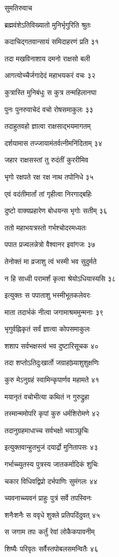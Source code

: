 सुमतिरुवाच

ब्रह्मवंशेऽतिविख्यातो मुनिर्भृगुरिति श्रुतः

कदाचिद्गतवान्सायं समिदाहरणं प्रति ३१

तदा मखविनाशाय दमनो राक्षसो बली

आगत्योच्चैर्जगादेदं महाभयकरं वचः ३२

कुत्रास्ति मुनिबंधुः स कुत्र तन्महिलानघा

पुनः पुनरुवाचेदं वचो रोषसमाकुलः ३३

तदाहुतवहो ज्ञात्वा राक्षसाद्भयमागतम्

दर्शयामास तज्जायामंतर्वत्नीमनिंदिताम् ३४

जहार राक्षसस्तां तु रुदंतीं कुररीमिव

भृगो रक्षपते रक्ष रक्ष नाथ तपोनिधे ३५

एवं वदंतीमार्तां तां गृहीत्वा निरगाद्बहिः

दुष्टो वाक्यप्रहारेण बोधयन्स भृगोः सतीम् ३६

ततो महाभयत्रस्तो गर्भश्चोदरमध्यतः

पपात प्रज्वलन्नेत्रो वैश्वानर इवांगजः ३७

तेनोक्तं मा व्रजाशु त्वं भस्मी भव सुदुर्मते

न हि साध्वी परामर्शं कृत्वा श्रेयोऽधियास्यसि ३८

इत्युक्तः स पपाताशु भस्मीभूतकलेवरः

माता तदार्भकं नीत्वा जगामाश्रममुन्मनाः ३९

भृगुर्वह्निकृतं सर्वं ज्ञात्वा कोपसमाकुलः

शशाप सर्वभक्षस्त्वं भव दुष्टारिसूचक ४०

तदा शप्तोऽतिदुःखार्तो जग्राहांघ्र्याशुशुक्षणिः

कुरु मेऽनुग्रहं स्वामिन्कृपार्णव महामते ४१

मयानृतं वचोभीत्या कथितं न गुरुद्रुहा

तस्मान्ममोपरि कृपां कुरु धर्मशिरोमणे ४२

तदानुग्रहमाधाच्च सर्वभक्षो भवाञ्छुचिः

इत्युक्तवान्हुतभुजं दयार्द्रो मुनितापसः ४३

गर्भाच्च्युतस्य पुत्रस्य जातकर्मादिकं शुचिः

चकार विधिवद्विप्रो दर्भपाणिः सुमंगलः ४४

च्यवनाच्च्यवनं प्राहुः पुत्रं सर्वे तपस्विनः

शनैःशनैः स ववृधे शुक्ले प्रतिपदिंदुवत् ४५

स जगाम तपः कर्तुं रेवां लोकैकपावनीम्

शिष्यैः परिवृतः सर्वैस्तपोबलसमन्वितैः ४६

